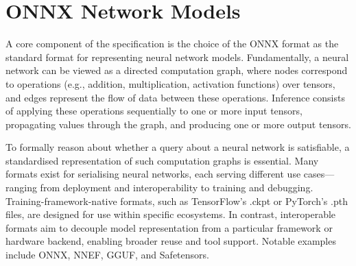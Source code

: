 \chapter{ONNX Network Models}
\label{sec:models}
%
A core component of the \vnnlib{} specification is the choice of the ONNX format as the standard format for representing neural network models. Fundamentally, a neural network can be viewed as a directed computation graph, where nodes correspond to operations (e.g., addition, multiplication, activation functions) over tensors, and edges represent the flow of data between these operations. Inference consists of applying these operations sequentially to one or more input tensors, propagating values through the graph, and producing one or more output tensors.

To formally reason about whether a query about a neural network is satisfiable, a standardised representation of such computation graphs is essential. Many formats exist for serialising neural networks, each serving different use cases—ranging from deployment and interoperability to training and debugging. Training-framework-native formats, such as TensorFlow’s .ckpt or PyTorch’s .pth files, are designed for use within specific ecosystems. In contrast, interoperable formats aim to decouple model representation from a particular framework or hardware backend, enabling broader reuse and tool support. Notable examples include ONNX, NNEF, GGUF, and Safetensors.

